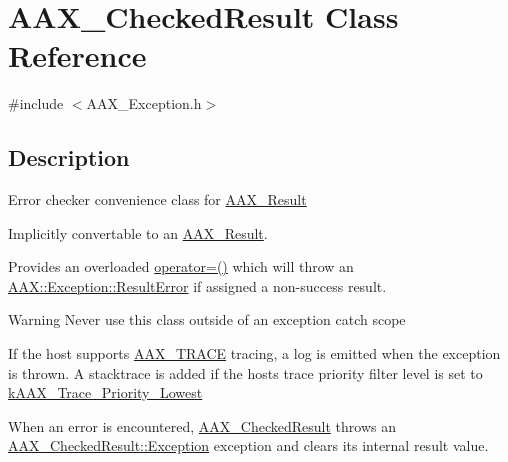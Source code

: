 \hypertarget{a01601}{}\section{A\+A\+X\+\_\+\+Checked\+Result Class Reference}
\label{a01601}


{\ttfamily \#include $<$A\+A\+X\+\_\+\+Exception.\+h$>$}



\subsection{Description}
Error checker convenience class for \mbox{\hyperlink{a00392_a4d8f69a697df7f70c3a8e9b8ee130d2f}{A\+A\+X\+\_\+\+Result}}

Implicitly convertable to an \mbox{\hyperlink{a00392_a4d8f69a697df7f70c3a8e9b8ee130d2f}{A\+A\+X\+\_\+\+Result}}.

Provides an overloaded {\ttfamily \mbox{\hyperlink{a01601_af95bea6f011d9a779170fc6128dc7295}{operator=()}}} which will throw an \mbox{\hyperlink{a01597}{A\+A\+X\+::\+Exception\+::\+Result\+Error}} if assigned a non-\/success result.

\begin{DoxyWarning}{Warning}
Never use this class outside of an exception catch scope
\end{DoxyWarning}
If the host supports \mbox{\hyperlink{a00395_ab53f1d6a94f8b6ebb3a101f71bfe4e82}{A\+A\+X\+\_\+\+T\+R\+A\+CE}} tracing, a log is emitted when the exception is thrown. A stacktrace is added if the host\textquotesingle{}s trace priority filter level is set to \mbox{\hyperlink{a00395_a68d0297c90a8d294e19ea781f8cda96a}{k\+A\+A\+X\+\_\+\+Trace\+\_\+\+Priority\+\_\+\+Lowest}}

When an error is encountered, \mbox{\hyperlink{a01601}{A\+A\+X\+\_\+\+Checked\+Result}} throws an \mbox{\hyperlink{a01601_a36fd71afc6d62993c1dd96e1ca9fcc0e}{A\+A\+X\+\_\+\+Checked\+Result\+::\+Exception}} exception and clears its internal result value.


